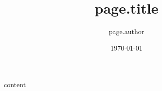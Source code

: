 \documentclass[12pt]{article}
\title{{{ page.title }}}
\author{{{ page.author }}}
\date{\today}
\begin{document}
\maketitle

{{ content }}
\end{document}
